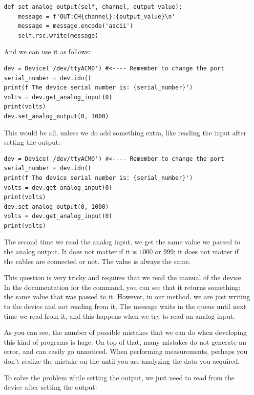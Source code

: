 \begin{verbatim}
def set_analog_output(self, channel, output_value):
    message = f'OUT:CH{channel}:{output_value}\n'
    message = message.encode('ascii')
    self.rsc.write(message)
\end{verbatim}

And we can use it as follows:

\begin{verbatim}
dev = Device('/dev/ttyACM0') #<---- Remember to change the port
serial_number = dev.idn()
print(f'The device serial number is: {serial_number}')
volts = dev.get_analog_input(0)
print(volts)
dev.set_analog_output(0, 1000)
\end{verbatim}

This would be all, unless we do add something extra, like reading the input after setting the output:

\begin{verbatim}
dev = Device('/dev/ttyACM0') #<---- Remember to change the port
serial_number = dev.idn()
print(f'The device serial number is: {serial_number}')
volts = dev.get_analog_input(0)
print(volts)
dev.set_analog_output(0, 1000)
volts = dev.get_analog_input(0)
print(volts)
\end{verbatim}

The second time we read the analog input, we get the same value we passed to the analog output. It does not matter if it is $1000$ or $999$; it does not matter if the cables are connected or not. The value is always the same.


This question is very tricky and requires that we read the manual of the device. In the documentation for the  command, you can see that it returns something: the same value that was passed to it. However, in our method, we are just writing to the device and not reading from it. The message waits in the queue until next time we read from it, and this happens when we try to read an analog input.

As you can see, the number of possible mistakes that we can do when developing this kind of programs is huge. On top of that, many mistakes do not generate an error, and can easily go unnoticed. When performing measurements, perhaps you don't realize the mistake on the  until you are analyzing the data you acquired.

To solve the problem while setting the output, we just need to read from the device after setting the output:

